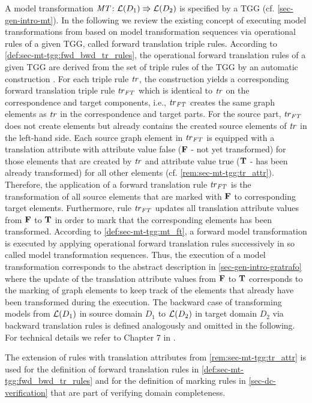 A model transformation $\mathit{MT}\colon \mathcal{L}(D_1) \Rrightarrow \mathcal{L}(D_2)$ is specified by a TGG (cf. \cref{sec-gen-intro-mt}).
In the following we review the existing concept of executing model transformations from \cite{FAGT2} based on model transformation sequences via operational rules of a given TGG, called forward translation triple rules.
According to \cref{def:sec-mt-tgg:fwd_bwd_tr_rules}, the operational forward translation rules of a given TGG are derived from the set of triple rules of the TGG by an automatic construction \cite{DBLP:conf/gg/SchurrK08,Hermann:2010:EAE:1866272.1866277}.
For each triple rule $\mathit{tr}$, the construction yields a corresponding forward translation triple rule $\mathit{tr}_\mathit{FT}$ which is identical to $\mathit{tr}$ on the correspondence and target components, i.e., $\mathit{tr}_\mathit{FT}$ creates the same graph elements as $\mathit{tr}$ in the correspondence and target parts.
For the source part, $\mathit{tr}_\mathit{FT}$ does not create elements but already contains the created source elements of $\mathit{tr}$ in the left-hand side.
Each source graph element in $\mathit{tr}_\mathit{FT}$ is equipped with a translation attribute with attribute value false ($\mathbf{F}$ - not yet transformed) for those elements that are created by $\mathit{tr}$ and attribute value true ($\mathbf{T}$ - has been already transformed) for all other elements (cf. \cref{rem:sec-mt-tgg:tr_attr}).
Therefore, the application of a forward translation rule $\mathit{tr}_\mathit{FT}$ is the transformation of all source elements that are marked with $\mathbf{F}$ to corresponding target elements.
Furthermore, rule $\mathit{tr}_\mathit{FT}$ updates all translation attribute values from $\mathbf{F}$ to $\mathbf{T}$ in order to mark that the corresponding elements has been transformed.
According to \cref{def:sec-mt-tgg:mt_ft}, a forward model transformation is executed by applying operational forward translation rules successively in so called model transformation sequences.
Thus, the execution of a model transformation corresponds to the abstract description in \cref{sec-gen-intro-gratrafo} where the update of the translation attribute values from $\mathbf{F}$ to $\mathbf{T}$ corresponds to the marking of graph elements to keep track of the elements that already have been transformed during the execution.
The backward case of transforming models from $\mathcal{L}(D_1)$ in source domain $D_1$ to $\mathcal{L}(D_2)$ in target domain $D_2$ via backward translation rules is defined analogously and omitted in the following.
For technical details we refer to Chapter 7 in \cite{FAGT2}.

The extension of rules with translation attributes from \cref{rem:sec-mt-tgg:tr_attr} is used for the definition of forward translation rules in \cref{def:sec-mt-tgg:fwd_bwd_tr_rules} and for the definition of marking rules in \cref{sec-dc-verification} that are part of verifying domain completeness.

